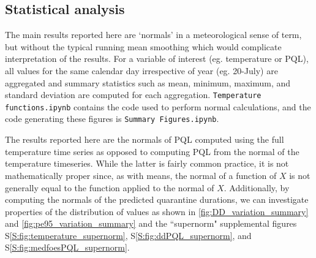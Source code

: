 \documentclass[10pt,a4paper,twocolumn]{article}
\begin{document}
\subsection*{Statistical analysis}

The main results reported here are `normals' in a meteorological sense of term,
but without the typical running mean smoothing which would complicate
interpretation of the results.
For a variable of interest (eg. temperature or PQL), 
all values for the same calendar day irrespective of year (eg. 20-July) are
aggregated and summary statistics such as mean, minimum, maximum, and standard deviation 
are computed for each aggregation.
\texttt{Temperature functions.ipynb} contains the code used to perform normal calculations, 
and the code generating these figures is \texttt{Summary Figures.ipynb}.

The results reported here are the normals of PQL computed using the full temperature time series
as opposed to computing PQL from the normal of the temperature timeseries.
While the latter is fairly common practice, it is not mathematically proper 
since, as with means, the normal of a function of $X$ is not generally equal to the function applied to the normal of $X$.
Additionally, by computing the normals of the predicted quarantine durations, 
we can investigate properties of the distribution of values as shown in 
\autoref{fig:DD_variation_summary} and \autoref{fig:pe95_variation_summary} 
and the ``supernorm" supplemental figures 
S\ref{S:fig:temperature_supernorm}, 
S\ref{S:fig:ddPQL_supernorm},
and S\ref{S:fig:medfoesPQL_supernorm}.

%
%
\end{document}
